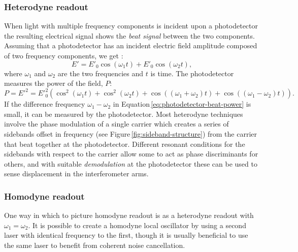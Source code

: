 \subsubsection{Heterodyne readout}
When light with multiple frequency components is incident upon a photodetector the resulting electrical signal shows the \emph{beat signal} between the two components. Assuming that a photodetector has an incident electric field amplitude composed of two frequency components, we get \cite{Freise2010}:
\begin{equation}
  E' = E'_0 \cos \left( \omega_1 t \right) + E'_0 \cos \left( \omega_2 t \right),
\end{equation}
where $\omega_1$ and $\omega_2$ are the two frequencies and $t$ is time. The photodetector measures the power of the field, $P$:
\begin{equation}
  \label{eq:photodetector-beat-power}
  P = {E'}^2 = {E'}_0^2 \left( \cos^2 \left( \omega_1 t \right) + \cos^2 \left( \omega_2 t \right) + \cos \left( \left( \omega_1 + \omega_2 \right) t \right) + \cos \left( \left( \omega_1 - \omega_2 \right) t \right) \right).
\end{equation}
If the difference frequency $\omega_1 - \omega_2$ in Equation\,\ref{eq:photodetector-beat-power} is small, it can be measured by the photodetector. Most heterodyne techniques involve the phase modulation of a single carrier which creates a series of sidebands offset in frequency (see Figure\,\ref{fig:sideband-structure}) from the carrier that beat together at the photodetector. Different resonant conditions for the sidebands with respect to the carrier allow some to act as phase discriminants for others, and with suitable \emph{demodulation} at the photodetector these can be used to sense displacement in the interferometer arms.

\subsubsection{\label{sec:homodyne-readout}Homodyne readout}
One way in which to picture homodyne readout is as a heterodyne readout with $\omega_1 = \omega_2$. It is possible to create a homodyne local oscillator by using a second laser with identical frequency to the first, though it is usually beneficial to use the same laser to benefit from coherent noise cancellation.

